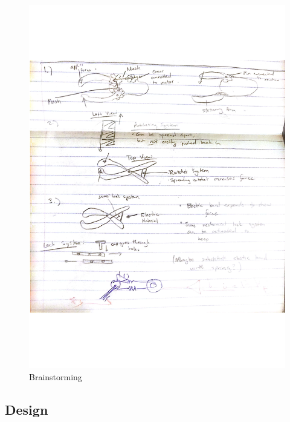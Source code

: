 \documentclass[letterpaper, 10 pt, conference]{ieeeconf}  %
\begin{document}
\begin{figure}[!htb]
	\includegraphics[page=2,width=\linewidth]{Brainstorming.pdf}
	\caption{Brainstorming}
	\label{fig:brain_2}
\end{figure}
\FloatBarrier

\subsection{Design}
\end{document}

